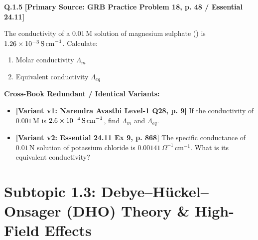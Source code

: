 \begin{problembox}
\textbf{Q.1.5} \hfill \textbf{[Primary Source: GRB Practice Problem 18, p. 48 / Essential  24.11]}
\label{q:qb-c1-05}

The conductivity of a $0.01\,\text{M}$ solution of magnesium sulphate () is $1.26 \times 10^{-3}\,\text{S\,cm}^{-1}$. Calculate:
\begin{enumerate}[label=(\alph*)]
    \item Molar conductivity $\Lambda_m$
    \item Equivalent conductivity $\Lambda_{eq}$
\end{enumerate}

\tcbline
\textbf{\color{accentamber}Cross-Book Redundant / Identical Variants:}
\begin{itemize}[leftmargin=*,itemsep=2pt]
    \item \textbf{[Variant v1: Narendra Avasthi Level-1 Q28, p. 9]} If the conductivity of $0.001\,\text{M}$  is $2.6 \times 10^{-4}\,\text{S\,cm}^{-1}$, find $\Lambda_m$ and $\Lambda_{eq}$.
    \item \textbf{[Variant v2: Essential  24.11 Ex 9, p. 868]} The specific conductance of $0.01\,\text{N}$ solution of potassium chloride is $0.00141\,\Omega^{-1}\,\text{cm}^{-1}$. What is its equivalent conductivity?
\end{itemize}
\end{problembox}

\section{Subtopic 1.3: Debye--H\"{u}ckel--Onsager (DHO) Theory \& High-Field Effects}

